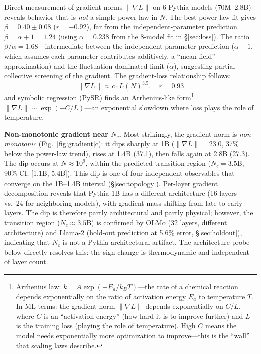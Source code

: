 \documentclass[11pt]{article}
\begin{document}
Direct measurement of gradient norms $\|\nabla L\|$ on 6 Pythia models (70M--2.8B)
reveals behavior that is \emph{not} a simple power law in $N$.
The best power-law fit gives $\beta = 0.40 \pm 0.08$ ($r = -0.92$),
far from the independent-parameter prediction $\beta = \alpha + 1 = 1.24$
(using $\alpha = 0.238$ from the 8-model fit in \S\ref{sec:loss}).
The ratio $\beta/\alpha = 1.68$---intermediate between the independent-parameter prediction ($\alpha+1$, which assumes each parameter contributes additively, a ``mean-field'' approximation)
and the fluctuation-dominated limit ($\alpha$), suggesting partial
collective screening of the gradient.
The gradient-loss relationship follows:
\begin{equation}
  \|\nabla L\| \approx c \cdot L(N)^{3.5},\quad r = 0.93
  \label{eq:gradloss}
\end{equation}
and symbolic regression (PySR) finds an Arrhenius-like form\footnote{Arrhenius law: $k = A\exp(-E_a/k_BT)$---the rate of a chemical reaction depends exponentially on the ratio of activation energy $E_a$ to temperature $T$. In ML terms: the gradient norm $\|\nabla L\|$ depends exponentially on $C/L$, where $C$ is an ``activation energy'' (how hard it is to improve further) and $L$ is the training loss (playing the role of temperature). High $C$ means the model needs exponentially more optimization to improve---this is the ``wall'' that scaling laws describe.}
$\|\nabla L\| \sim \exp(-C/L)$---an exponential slowdown where loss plays the role of temperature.

\textbf{Non-monotonic gradient near $N_c$.}
Most strikingly, the gradient norm is \emph{non-monotonic} (Fig.~\ref{fig:gradient}c):
it dips sharply at 1B ($\|\nabla L\| = 23.0$, 37\% below the power-law trend),
rises at 1.4B (37.1), then falls again at 2.8B (27.3).
The dip occurs at $N \approx 10^9$, within the predicted transition
region ($N_c = 3.5$B, 90\% CI: [1.1B, 5.4B]).
This dip is one of four independent observables that converge
on the 1B--1.4B interval (\S\ref{sec:topology}).
Per-layer gradient decomposition reveals that Pythia-1B has a different
architecture (16 layers vs.\ 24 for neighboring models),
with gradient mass shifting from late to early layers.
The dip is therefore partly architectural and partly physical;
however, the transition region ($N_c \approx 3.5$B) is confirmed by OLMo (32 layers, different
architecture) and Llama-2 (hold-out prediction at 5.6\% error, \S\ref{sec:holdout}),
indicating that $N_c$ is not a Pythia architectural artifact.
The architecture probe below directly resolves this: the sign change is thermodynamic and independent of layer count.
\end{document}
